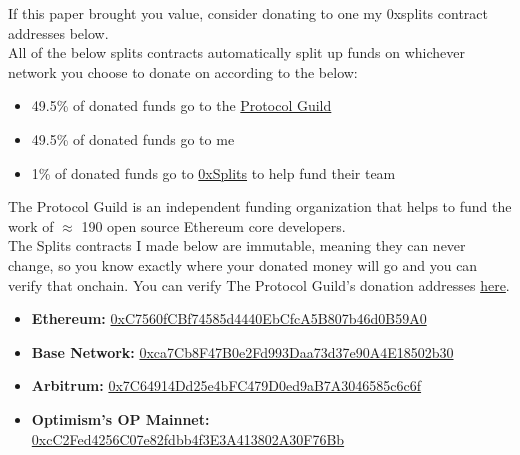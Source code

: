 \documentclass[12pt]{article}
\begin{document}
If this paper brought you value, consider donating to one my 0xsplits contract addresses below. \\

All of the below splits contracts automatically split up funds on whichever network you choose to donate on according to the below: 

\begin{itemize}
    \item 49.5\% of donated funds go to the \href{https://x.com/ProtocolGuild}{Protocol Guild}
    \item 49.5\% of donated funds go to me
    \item 1\% of donated funds go to \href{https://x.com/0xSplits}{0xSplits} to help fund their team
\end{itemize}

The Protocol Guild is an independent funding organization that helps to fund the work of $\approx$ 190 open source Ethereum core developers. \\

The Splits contracts I made below are immutable, meaning they can never change, so you know exactly where your donated money will go and you can verify that onchain. You can verify The Protocol Guild's donation addresses \href{https://protocol-guild.readthedocs.io/en/latest/03-donate.html}{here}. \\

\begin{itemize}
    \item \textbf{Ethereum:} \href{https://app.splits.org/accounts/0xC7560fCBf74585d4440EbCfcA5B807b46d0B59A0/?chainId=1}{0xC7560fCBf74585d4440EbCfcA5B807b46d0B59A0}
    \item \textbf{Base Network:} \href{https://app.splits.org/accounts/0xca7Cb8F47B0e2Fd993Daa73d37e90A4E18502b30/?chainId=8453}{0xca7Cb8F47B0e2Fd993Daa73d37e90A4E18502b30}
    \item \textbf{Arbitrum:} \href{https://app.splits.org/accounts/0x7C64914Dd25e4bFC479D0ed9aB7A3046585c6c6f/?chainId=42161}{0x7C64914Dd25e4bFC479D0ed9aB7A3046585c6c6f}
    \item \textbf{Optimism's OP Mainnet:} \href{https://app.splits.org/accounts/0xcC2Fed4256C07e82fdbb4f3E3A413802A30F76Bb/?chainId=10}{0xcC2Fed4256C07e82fdbb4f3E3A413802A30F76Bb}
\end{itemize}
\end{document}

